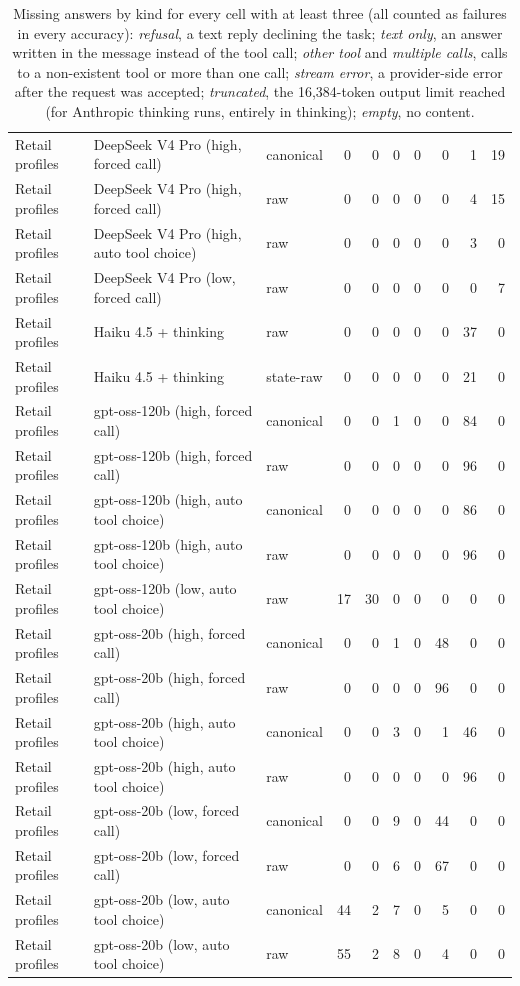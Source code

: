 \begin{table}[htbp]
{\begin{tabular}{lllrrrrrrr}
Retail profiles & DeepSeek V4 Pro (high, forced call) & canonical & 0 & 0 & 0 & 0 & 0 & 1 & 19 \\
Retail profiles & DeepSeek V4 Pro (high, forced call) & raw & 0 & 0 & 0 & 0 & 0 & 4 & 15 \\
Retail profiles & DeepSeek V4 Pro (high, auto tool choice) & raw & 0 & 0 & 0 & 0 & 0 & 3 & 0 \\
Retail profiles & DeepSeek V4 Pro (low, forced call) & raw & 0 & 0 & 0 & 0 & 0 & 0 & 7 \\
Retail profiles & Haiku 4.5 + thinking & raw & 0 & 0 & 0 & 0 & 0 & 37 & 0 \\
Retail profiles & Haiku 4.5 + thinking & state-raw & 0 & 0 & 0 & 0 & 0 & 21 & 0 \\
Retail profiles & gpt-oss-120b (high, forced call) & canonical & 0 & 0 & 1 & 0 & 0 & 84 & 0 \\
Retail profiles & gpt-oss-120b (high, forced call) & raw & 0 & 0 & 0 & 0 & 0 & 96 & 0 \\
Retail profiles & gpt-oss-120b (high, auto tool choice) & canonical & 0 & 0 & 0 & 0 & 0 & 86 & 0 \\
Retail profiles & gpt-oss-120b (high, auto tool choice) & raw & 0 & 0 & 0 & 0 & 0 & 96 & 0 \\
Retail profiles & gpt-oss-120b (low, auto tool choice) & raw & 17 & 30 & 0 & 0 & 0 & 0 & 0 \\
Retail profiles & gpt-oss-20b (high, forced call) & canonical & 0 & 0 & 1 & 0 & 48 & 0 & 0 \\
Retail profiles & gpt-oss-20b (high, forced call) & raw & 0 & 0 & 0 & 0 & 96 & 0 & 0 \\
Retail profiles & gpt-oss-20b (high, auto tool choice) & canonical & 0 & 0 & 3 & 0 & 1 & 46 & 0 \\
Retail profiles & gpt-oss-20b (high, auto tool choice) & raw & 0 & 0 & 0 & 0 & 0 & 96 & 0 \\
Retail profiles & gpt-oss-20b (low, forced call) & canonical & 0 & 0 & 9 & 0 & 44 & 0 & 0 \\
Retail profiles & gpt-oss-20b (low, forced call) & raw & 0 & 0 & 6 & 0 & 67 & 0 & 0 \\
Retail profiles & gpt-oss-20b (low, auto tool choice) & canonical & 44 & 2 & 7 & 0 & 5 & 0 & 0 \\
Retail profiles & gpt-oss-20b (low, auto tool choice) & raw & 55 & 2 & 8 & 0 & 4 & 0 & 0 \\
\bottomrule
\end{tabular}}
\caption{Missing answers by kind for every cell with at least three (all counted as failures in every accuracy): \emph{refusal}, a text reply declining the task; \emph{text only}, an answer written in the message instead of the tool call; \emph{other tool} and \emph{multiple calls}, calls to a non-existent tool or more than one call; \emph{stream error}, a provider-side error after the request was accepted; \emph{truncated}, the 16,384-token output limit reached (for Anthropic thinking runs, entirely in thinking); \emph{empty}, no content.}
\label{tab:missing}
\end{table}

